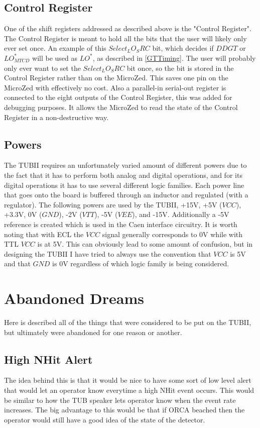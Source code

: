\documentclass[11pt,a4paper]{article}
\begin{document}
\subsection{Control Register}
One of the shift registers addressed as described above is the "Control Register". The Control Register is meant to hold all the bits that the user will likely only ever set once. An example of this $Select_LO_SRC$ bit, which decides if $DDGT$ or $LO^*_{MTCD}$ will be used as $LO^*$, as described in \ref{GTTiming}. The user will probably only ever want to set the $Select_LO_SRC$ bit once, so the bit is stored in the Control Register rather than on the MicroZed. This saves one pin on the MicroZed with effectively no cost. Also a parallel-in serial-out register is connected to the eight outputs of the Control Register, this was added for debugging purposes. It allows the MicroZed to read the state of the Control Register in a non-destructive way. 
\subsection{Powers}
The TUBII requires an unfortunately varied amount of different powers due to the fact that it has to perform both analog and digital operations, and for its digital operations it has to use several different logic families. Each power line that goes onto the board is buffered through an inductor and regulated (with a regulator). The following powers are used by the TUBII, +15V, +5V ($VCC$), +3.3V, 0V ($GND$), -2V ($VTT$), -5V ($VEE$), and -15V. Additionally a -5V reference is created which is used in the Caen interface circuitry. It is worth noting that with ECL the $VCC$ signal generally corresponds to 0V while with TTL $VCC$ is at 5V. This can obviously lead to some amount of confusion, but in designing the TUBII I have tried to always use the convention that $VCC$ is 5V and that $GND$ is 0V regardless of which logic family is being considered.

\section{Abandoned Dreams}
Here is described all of the things that were considered to be put on the TUBII, but ultimately were abandoned for one reason or another.
\subsection{High NHit Alert}
The idea behind this is that it would be nice to have some sort of low level alert that would let an operator know everytime a high NHit event occurs. This would be similar to how the TUB speaker lets operator know when the event rate increases. The big advantage to this would be that if ORCA beached then the operator would still have a good idea of the state of the detector.
\end{document}
